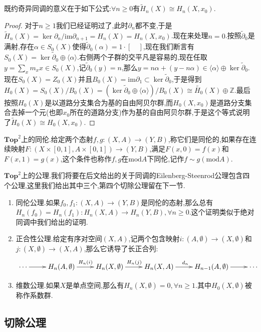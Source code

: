 既约奇异同调的意义在于如下公式:$\forall n\ge0$有$\widetilde{H}_n(X)\cong H_n(X,x_0)$.
\begin{proof}
	
	对于$n\ge1$我们已经证明过了,此时$\partial_n$都不变,于是$\widetilde{H}_n(X)=\ker\partial_n/\mathrm{im}\partial_{n+1}=H_n(X)=H_n(X,x_0)$.现在来处理$n=0$.按照$\widetilde{\partial}_0$是满射,存在$\alpha\in S_0(X)$使得$\widetilde{\partial}_0(\alpha)=1\cdot[\quad]$,现在我们断言有$S_0(X)=\ker\widetilde{\partial}_0\oplus\langle\alpha\rangle$.右侧两个子群的交平凡是容易的,现在任取$y=\sum_xm_xx\in S_0(X)$,记$\widetilde{\partial}_0(y)=n$,那么$y=n\alpha+(y-n\alpha)\in\langle\alpha\rangle\oplus\ker\widetilde{\partial}_0$.现在$S_0(X)=Z_0(X)$并且$B_0(X)=\mathrm{im}\partial_1\subset\ker\widetilde{\partial}_0$,于是得到$H_0(X)=S_0(X)/B_0(X)=(\ker\widetilde{\partial}_0\oplus\langle\alpha\rangle)/B_0(X)\cong\widetilde{H_0}(X)\oplus\mathbb{Z}$.最后按照$H_0(X)$是以道路分支集合为基的自由阿贝尔群,而$H_0(X,x_0)$是道路分支集合去掉一个元(也即$x_0$所在的道路分支)作为基的自由阿贝尔群,于是这个等式说明了$\widetilde{H}_0(X)\cong H_0(X,x_0)$.
\end{proof}

$\textbf{Top}^2$上的同伦.给定两个态射$f,g:(X,A)\to(Y,B)$,称它们是同伦的,如果存在连续映射$F:(X\times[0,1],A\times[0,1])\to(Y,B)$,满足$F(x,0)=f(x)$和$F(x,1)=g(x)$,这个条件也称作$f,g$在$\mathrm{mod} A$下同伦,记作$f\sim g(\mathrm{mod} A)$.

$\textbf{Top}^2$上的公理.我们将要在后文给出的关于同调的Eilenberg-Steenrod公理包含四个公理,这里我们给出其中三个,第四个切除公理留在下一节.
\begin{enumerate}
	\item 同伦公理.如果$f_0,f_1:(X,A)\to(Y,B)$是同伦的态射,那么总有$H_n(f_0)=H_n(f_1):H_n(X,A)\to H_n(Y,B),\forall n\ge0$.这个证明类似于绝对同调中我们给出的证明.
	\item 正合性公理.给定有序对空间$(X,A)$,记两个包含映射$i:(A,\emptyset)\to(X,\emptyset)$和$j:(X,\emptyset)\to(X,A)$,那么它诱导了长正合列:
	$$\xymatrix{\cdots\ar[r]&H_n(A,\emptyset)\ar[r]^{H_n(i)}&H_n(X,\emptyset)\ar[r]^{H_n(j)}&H_n(X,A)\ar[r]^{d_n}&H_{n-1}(A,\emptyset)\ar[r]&\cdots}$$
	\item 维数公理.如果$X$是单点空间,那么有$H_n(X,\emptyset)=0,\forall n\ge1$.其中$H_0(X,\emptyset)$被称作系数群.
\end{enumerate}
\newpage
\subsection{切除公理}

